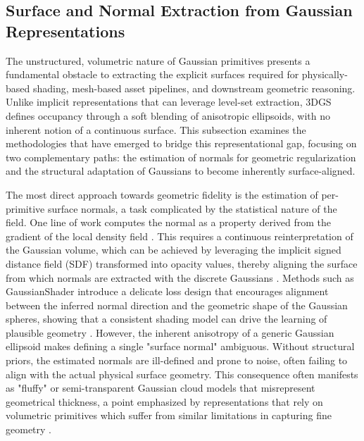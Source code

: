 \documentclass[11pt,a4paper]{article}
\begin{document}
\subsection{Surface and Normal Extraction from Gaussian Representations}


The unstructured, volumetric nature of Gaussian primitives presents a fundamental obstacle to extracting the explicit surfaces required for physically-based shading, mesh-based asset pipelines, and downstream geometric reasoning. Unlike implicit representations that can leverage level-set extraction, 3DGS defines occupancy through a soft blending of anisotropic ellipsoids, with no inherent notion of a continuous surface. This subsection examines the methodologies that have emerged to bridge this representational gap, focusing on two complementary paths: the estimation of normals for geometric regularization and the structural adaptation of Gaussians to become inherently surface-aligned.

The most direct approach towards geometric fidelity is the estimation of per-primitive surface normals, a task complicated by the statistical nature of the field. One line of work computes the normal as a property derived from the gradient of the local density field \cite{arxiv:2404.00409v1}. This requires a continuous reinterpretation of the Gaussian volume, which can be achieved by leveraging the implicit signed distance field (SDF) transformed into opacity values, thereby aligning the surface from which normals are extracted with the discrete Gaussians \cite{arxiv:2404.00409v1}. Methods such as GaussianShader introduce a delicate loss design that encourages alignment between the inferred normal direction and the geometric shape of the Gaussian spheres, showing that a consistent shading model can drive the learning of plausible geometry \cite{arxiv:2311.17977v1}. However, the inherent anisotropy of a generic Gaussian ellipsoid makes defining a single "surface normal" ambiguous. Without structural priors, the estimated normals are ill-defined and prone to noise, often failing to align with the actual physical surface geometry. This consequence often manifests as "fluffy" or semi-transparent Gaussian cloud models that misrepresent geometrical thickness, a point emphasized by representations that rely on volumetric primitives which suffer from similar limitations in capturing fine geometry \cite{arxiv:2103.01954v2}.
\end{document}
